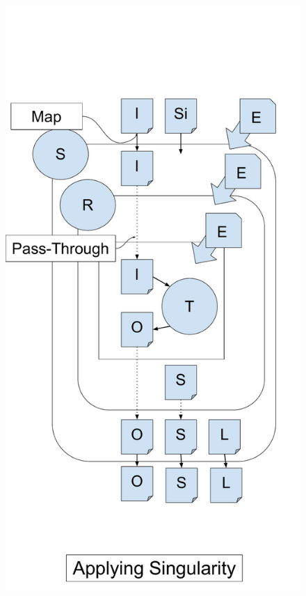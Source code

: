 \documentclass[conference]{IEEEtran}
\begin{document}
\begin{figure}[t]
\begin{minipage}[t]{0.2\textwidth}
  \includegraphics[width=\textwidth]{graphics/nested_sandbox_2_detail_wLlabel.pdf}
\end{minipage}
\begin{minipage}[t]{0.21\textwidth}

\end{minipage}
\end{figure}
\end{document}
